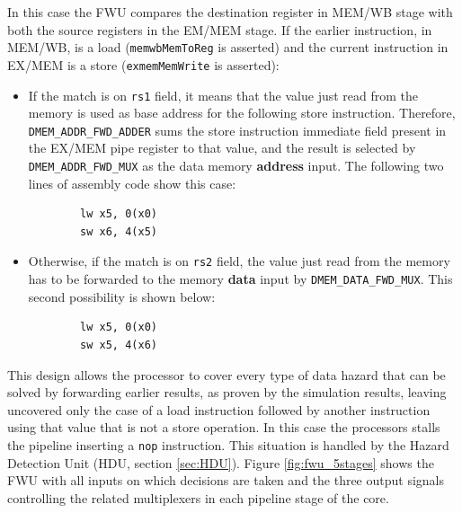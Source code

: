 \documentclass[a4paper]{article}
\begin{document}
In this case the FWU compares the destination register in MEM/WB stage with both the source registers in the EM/MEM stage. If the earlier instruction, in MEM/WB, is a load (\texttt{memwbMemToReg} is asserted) and the current instruction in EX/MEM is a store (\texttt{exmemMemWrite} is asserted):
\begin{itemize}
    \item If the match is on \texttt{rs1} field, it means that the value just read from the memory is used as base address for the following store instruction. Therefore, \texttt{DMEM\_ADDR\_FWD\_ADDER} sums the store instruction immediate field present in the EX/MEM pipe register to that value, and the result is selected by \texttt{DMEM\_ADDR\_FWD\_MUX} as the data memory \textbf{address} input. The following two lines of assembly code show this case:
    \begin{verbatim}
        lw x5, 0(x0)
        sw x6, 4(x5)
    \end{verbatim}
    \item Otherwise, if the match is on \texttt{rs2} field, the value just read from the memory has to be forwarded to the memory \textbf{data} input by \texttt{DMEM\_DATA\_FWD\_MUX}. This second possibility is shown below:
    \begin{verbatim}
        lw x5, 0(x0)
        sw x5, 4(x6)
    \end{verbatim}
\end{itemize}

This design allows the processor to cover every type of data hazard that can be solved by forwarding earlier results, as proven by the simulation results, leaving uncovered only the case of a load instruction followed by another instruction using that value that is not a store operation. In this case the processors stalls the pipeline inserting a \texttt{nop} instruction. This situation is handled by the Hazard Detection Unit (HDU, section \ref{sec:HDU}).
Figure \ref{fig:fwu_5stages} shows the FWU with all inputs on which decisions are taken and the three output signals controlling the related multiplexers in each pipeline stage of the core.
\end{document}

